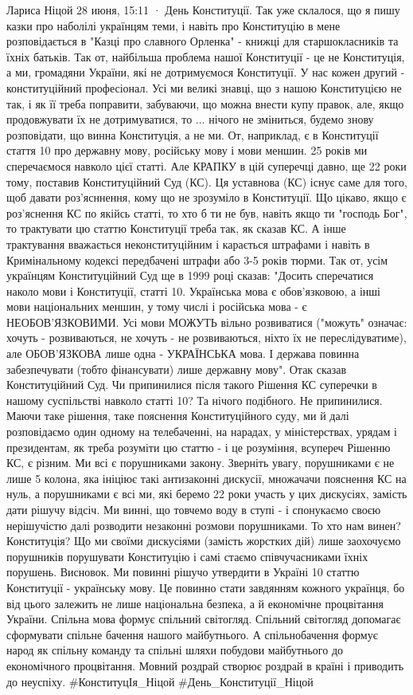 \documentclass[a4paper,11pt]{extreport}
\begin{document}
Лариса Ніцой
28 июня, 15:11 ·
День Конституції.
Так уже склалося, що я пишу казки про наболілі українцям теми, і навіть про Конституцію в мене розповідається в "Казці про славного Орленка" - книжці для старшокласників та їхніх батьків.
Так от, найбільша проблема нашої Конституції - це не Конституція, а ми, громадяни України, які не дотримуємося Конституції. У нас кожен другий - конституційний професіонал. Усі ми великі знавці, що з нашою Конституцією не так, і як її треба поправити, забуваючи, що можна внести купу правок, але, якщо продовжувати їх не дотримуватися, то ... нічого не зміниться, будемо знову розповідати, що винна Конституція, а не ми.
От, наприклад, є в Конституції стаття 10 про державну мову, російську мову і мови меншин. 25 років ми сперечаємося навколо цієї статті. Але КРАПКУ в цій суперечці давно, ще 22 роки тому, поставив Конституційний Суд (КС).
Ця уставнова (КС) існує саме для того, щоб давати роз'ясннення, кому що не зрозуміло в Конституції. Що цікаво, якщо є роз'яснення КС по якійсь статті, то хто б ти не був, навіть якщо ти "господь Бог", то трактувати цю статтю Конституції треба так, як сказав КС. А інше трактування вважається неконституційним і карається штрафами і навіть в Кримінальному кодексі передбачені штрафи або 3-5 років тюрми.
Так от, усім українцям Конституційний Суд ще в 1999 році сказав: "Досить сперечатися наколо мови і Конституції, статті 10. Українська мова є обов'язковою, а інші мови національних меншин, у тому числі і російська мова - є НЕОБОВ'ЯЗКОВИМИ. Усі мови МОЖУТЬ вільно розвиватися ("можуть" означає: хочуть - розвиваються, не хочуть - не розвиваються, ніхто їх не переслідуватиме), але ОБОВ'ЯЗКОВА лише одна - УКРАЇНСЬКА мова. І держава повинна забезпечувати (тобто фінансувати) лише державну мову". Отак сказав Конституційний Суд.
Чи припинилися після такого Рішення КС суперечки в нашому суспільстві навколо статті 10? Та нічого подібного. Не припинилися.
Маючи таке рішення, таке пояснення Конституційного суду, ми й далі розповідаємо один одному на телебаченні, на нарадах, у міністерствах, урядам і президентам, як треба розуміти цю статтю - і це розуміння, всупереч Рішенню КС, є різним.
Ми всі є порушниками закону. Зверніть увагу, порушниками є не лише 5 колона, яка ініціює такі антизаконні дискусії, множачачи пояснення КС на нуль, а порушниками є всі ми, які беремо 22 роки участь у цих дискусіях, замість дати рішучу відсіч. Ми винні, що товчемо воду в ступі - і спонукаємо своєю нерішучістю далі розводити незаконні розмови порушниками.
То хто нам винен? Конституція? Що ми своїми дискусіями (замість жорстких дій) лише заохочуємо порушників порушувати Конституцію і самі стаємо співчучасниками їхніх порушень.
Висновок. Ми повинні рішучо утвердити в Україні 10 статтю Конституції - українську мову. Це повинно стати завдянням кожного українця, бо від цього залежить не лише національна безпека, а й економічне процвітання України. Спільна мова формує спільний світогляд. Спільний світогляд допомагає сформувати спільне бачення нашого майбутнього. А спільнобачення формує народ як спільну команду та спільні шляхи побудови майбутнього до економічного процвітання. Мовний роздрай створює роздрай в країні і приводить до неуспіху.
#КонституцІя_Ніцой
#День_Конституції_Ніцой
\end{document}
